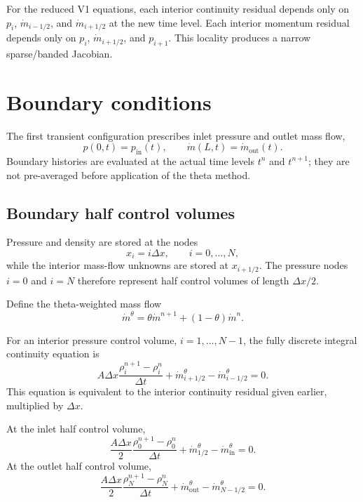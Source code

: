 \documentclass[11pt]{article}
\newcommand{\mdot}{\dot m}
\begin{document}
For the reduced V1 equations, each interior continuity residual depends only on $p_i$, $\mdot_{i-1/2}$, and $\mdot_{i+1/2}$ at the new time level. Each interior momentum residual depends only on $p_i$, $\mdot_{i+1/2}$, and $p_{i+1}$. This locality produces a narrow sparse/banded Jacobian.

\section{Boundary conditions}

The first transient configuration prescribes inlet pressure and outlet mass
flow,
\begin{equation}
p(0,t)=p_{\mathrm{in}}(t),
\qquad
\mdot(L,t)=\mdot_{\mathrm{out}}(t).
\end{equation}
Boundary histories are evaluated at the actual time levels $t^n$ and
$t^{n+1}$; they are not pre-averaged before application of the theta
method.

\subsection{Boundary half control volumes}

Pressure and density are stored at the nodes
\[
x_i=i\Delta x,\qquad i=0,\ldots,N,
\]
while the interior mass-flow unknowns are stored at
$x_{i+1/2}$.  The pressure nodes $i=0$ and $i=N$ therefore represent
half control volumes of length $\Delta x/2$.

Define the theta-weighted mass flow
\begin{equation}
\mdot^\theta
=
\theta\mdot^{n+1}+(1-\theta)\mdot^n.
\label{eq:thetaflow}
\end{equation}

For an interior pressure control volume, $i=1,\ldots,N-1$, the
fully discrete integral continuity equation is
\begin{equation}
A\Delta x
\frac{\rho_i^{n+1}-\rho_i^n}{\Delta t}
+
\mdot_{i+1/2}^{\theta}
-
\mdot_{i-1/2}^{\theta}
=0.
\label{eq:interior_cv_mass}
\end{equation}
This equation is equivalent to the interior continuity residual given
earlier, multiplied by $\Delta x$.

At the inlet half control volume,
\begin{equation}
\frac{A\Delta x}{2}
\frac{\rho_0^{n+1}-\rho_0^n}{\Delta t}
+
\mdot_{1/2}^{\theta}
-
\mdot_{\mathrm{in}}^{\theta}
=0.
\label{eq:inlet_half_cv}
\end{equation}
At the outlet half control volume,
\begin{equation}
\frac{A\Delta x}{2}
\frac{\rho_N^{n+1}-\rho_N^n}{\Delta t}
+
\mdot_{\mathrm{out}}^{\theta}
-
\mdot_{N-1/2}^{\theta}
=0.
\label{eq:outlet_half_cv}
\end{equation}
\end{document}
